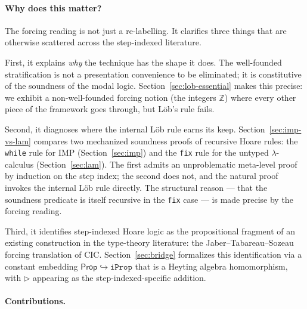 \documentclass[11pt]{article}
\begin{document}
\paragraph{Why does this matter?}
The forcing reading is not just a re-labelling. It clarifies three
things that are otherwise scattered across the step-indexed
literature.

First, it explains \emph{why} the technique has the shape it does.
The well-founded stratification is not a presentation convenience
to be eliminated; it is constitutive of the soundness of the modal
logic. Section~\ref{sec:lob-essential} makes this precise: we
exhibit a non-well-founded forcing notion (the integers $\mathbb{Z}$)
where every other piece of the framework goes through, but Löb's
rule fails.

Second, it diagnoses where the internal Löb rule earns its keep.
Section~\ref{sec:imp-vs-lam} compares two mechanized soundness
proofs of recursive Hoare rules: the \texttt{while} rule for IMP
(Section~\ref{sec:imp}) and the \texttt{fix} rule for the untyped
$\lambda$-calculus (Section~\ref{sec:lam}). The first admits an
unproblematic meta-level proof by induction on the step index; the
second does not, and the natural proof invokes the internal Löb rule
directly. The structural reason --- that the soundness predicate is
itself recursive in the \texttt{fix} case --- is made precise by
the forcing reading.

Third, it identifies step-indexed Hoare logic as the propositional
fragment of an existing construction in the type-theory literature:
the Jaber--Tabareau--Sozeau forcing translation of CIC.
Section~\ref{sec:bridge} formalizes this identification via a
constant embedding $\mathsf{Prop} \hookrightarrow \mathtt{iProp}$
that is a Heyting algebra homomorphism, with $\triangleright$
appearing as the step-indexed-specific addition.

\paragraph{Contributions.}
\end{document}
